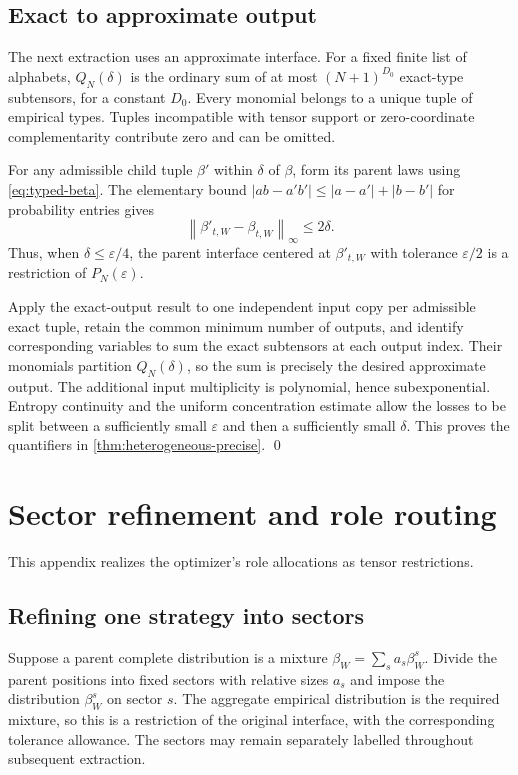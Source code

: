 \documentclass[11pt,a4paper]{article}
\newcommand{\norm}[1]{\left\lVert#1\right\rVert}
\begin{document}
\subsection{Exact to approximate output}

The next extraction uses an approximate interface. For a fixed finite list of alphabets, $Q_N(\delta)$ is the ordinary sum of at most $(N+1)^{D_0}$ exact-type subtensors, for a constant $D_0$. Every monomial belongs to a unique tuple of empirical types. Tuples incompatible with tensor support or zero-coordinate complementarity contribute zero and can be omitted.

For any admissible child tuple $\beta'$ within $\delta$ of $\beta$, form its parent laws using \cref{eq:typed-beta}. The elementary bound $|ab-a'b'|\le|a-a'|+|b-b'|$ for probability entries gives
\[
\norm{\beta'_{t,W}-\beta_{t,W}}_\infty\le2\delta.
\]
Thus, when $\delta\le\varepsilon/4$, the parent interface centered at $\beta'_{t,W}$ with tolerance $\varepsilon/2$ is a restriction of $P_N(\varepsilon)$.

Apply the exact-output result to one independent input copy per admissible exact tuple, retain the common minimum number of outputs, and identify corresponding variables to sum the exact subtensors at each output index. Their monomials partition $Q_N(\delta)$, so the sum is precisely the desired approximate output. The additional input multiplicity is polynomial, hence subexponential. Entropy continuity and the uniform concentration estimate allow the losses to be split between a sufficiently small $\varepsilon$ and then a sufficiently small $\delta$. This proves the quantifiers in \cref{thm:heterogeneous-precise}. \qed

\section{Sector refinement and role routing}\label{app:roles}

This appendix realizes the optimizer's role allocations as tensor restrictions.

\subsection{Refining one strategy into sectors}

Suppose a parent complete distribution is a mixture
$\beta_W=\sum_s a_s\beta_W^s$. Divide the parent positions into fixed sectors with relative sizes $a_s$ and impose the distribution $\beta_W^s$ on sector $s$. The aggregate empirical distribution is the required mixture, so this is a restriction of the original interface, with the corresponding tolerance allowance. The sectors may remain separately labelled throughout subsequent extraction.
\end{document}
